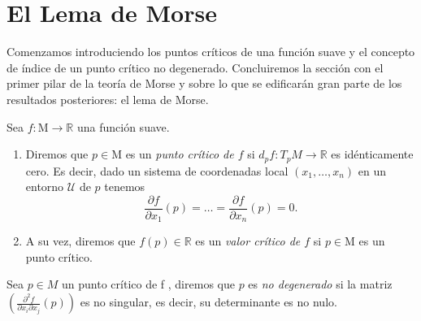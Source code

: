 \bigskip
\section{El Lema de Morse}

Comenzamos introduciendo los puntos críticos de una función suave y el concepto de índice de un punto crítico no degenerado. Concluiremos la sección con el primer pilar de la teoría de Morse y sobre lo que se edificarán gran parte de los resultados posteriores: el lema de Morse.
\medskip
\begin{definition}
    Sea $f: $M$ \to \mathbb{R}$ una función suave.
    \begin{enumerate}[label=\roman*)]
        \item Diremos que $p\in \mathrm{M}$ es un \textit{punto crítico de $f$} si $d_{p}f:T_{p}M\to \mathbb{R}$ es idénticamente cero. Es decir, dado un sistema de coordenadas local $(x_{1}, \dots ,x_{n})$ en un entorno $\mathcal{U}$ de $p$ tenemos
        \begin{equation*}
            \frac{\partial f}{\partial x_1}(p)= \dots = \frac{\partial f}{\partial x_n}(p) = 0.
        \end{equation*}
        
        \item A su vez, diremos que $f(p)\in \mathbb{R}$ es un \textit{valor crítico de $f$} si $p \in \mathrm{M}$ es un punto crítico.
        
    \end{enumerate}
\end{definition}
\bigskip

\begin{definition}
    Sea $p\in M$ un punto crítico de f , diremos que $p$ es \textit{no degenerado} si la matriz  $\left(\frac{\partial^{2}f}{\partial x_i \partial x_j}(p)\right)$ es no singular, es decir, su determinante es no nulo.
\end{definition}
\bigskip

